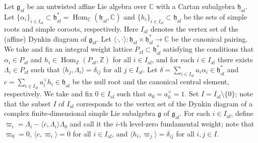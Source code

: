 \documentclass[ALCO,ThmDefs,Unicode,epreuves]{cedram}
\newcommand{\Fg}{\mathfrak{g}}
\newcommand{\Fh}{\mathfrak{h}}
\newcommand{\BC}{\mathbb{C}}
\newcommand{\BZ}{\mathbb{Z}}
\DeclareMathOperator{\af}{af}
\DeclareMathOperator{\Hom}{Hom}
\begin{document}
Let 
$\Fg_{\af}$ 
be an untwisted affine Lie algebra over $\BC$ 
with a Cartan subalgebra $\Fh_{\af}$. 
Let 
$\{ \alpha_i \}_{i \in I_{\af}} \subset \Fh_{\af}^* = \Hom_{\BC}(\Fh_{\af},\BC)$ 
and 
$\{ h_i \}_{i \in I_{\af}} \subset \Fh_{\af}$
be the sets of simple roots and simple coroots, respectively. 
Here $I_{\af}$ denotes the vertex set of the (affine) Dynkin diagram of $\Fg_{\af}$. 
Let 
$\langle \cdot , \cdot \rangle : \Fh_{\af} \times \Fh_{\af}^* \rightarrow \BC$ 
be the canonical pairing. 
We take and fix an integral weight lattice 
$P_{\af} \subset \Fh_{\af}^*$ 
satisfying the conditions that 
$\alpha_i \in P_{\af}$ 
and 
$h_i \in \Hom_{\BZ}(P_{\af},\BZ)$ 
for all 
$i \in I_{\af}$, and for each 
$i \in I_{\af}$
there exists 
$\Lambda_i \in P_{\af}$ 
such that 
$\langle h_j , \Lambda_i \rangle = \delta_{ij}$ 
for all 
$j \in I_{\af}$. 
Let 
$\delta = \sum_{i \in I_{\af}} a_i \alpha_i \in \Fh_{\af}^*$ 
and 
$c = \sum_{i \in I_{\af}} a_i^{\vee} h_i \in \Fh_{\af}$ 
be the null root and the canonical central element, respectively.
We take and fix $0 \in I_{\af}$ such that 
$a_0 = a_0^{\vee} = 1$. 
Set 
$I = I_{\af} \setminus \{ 0 \}$; 
note that the subset $I$ of $I_{\af}$ 
corresponds to the vertex set of the Dynkin diagram of a 
complex finite-dimensional simple Lie subalgebra $\Fg$ of $\Fg_{\af}$. 
For each 
$i \in I_{\af}$, 
define
$\varpi_i = \Lambda_i - \langle c , \Lambda_i \rangle \Lambda_0$
and call it the 
$i$-th level-zero fundamental weight; 
note that 
$\varpi_0 = 0$, 
$\langle c , \varpi_i \rangle = 0$
for all $i \in I_{\af}$, and 
$\langle h_i , \varpi_j \rangle = \delta_{ij}$ 
for all $i,j \in I$.
\end{document}
